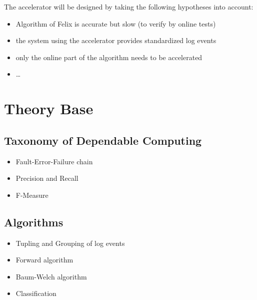 \documentclass[12pt]{article} %
\begin{document}
The accelerator will be designed by taking the following hypotheses into account:
\begin{itemize}
    \item Algorithm of Felix is accurate but slow (to verify by online tests)
    \item the system using the accelerator provides standardized log events
    \item only the online part of the algorithm needs to be accelerated
    \item \dots
\end{itemize}


\section{Theory Base} %


\subsection{Taxonomy of Dependable Computing} %
\begin{itemize} %
    \item Fault-Error-Failure chain \cite{IEEE04_Avizienis}
    \item Precision and Recall \cite{rijsbergen79}
    \item F-Measure \cite{DARPA99_Makhoul}
\end{itemize} 


\subsection{Algorithms} %
\begin{itemize} %
    \item Tupling and Grouping of log events
    \item Forward algorithm
    \item Baum-Welch algorithm
    \item Classification
\end{itemize} 
\end{document}
